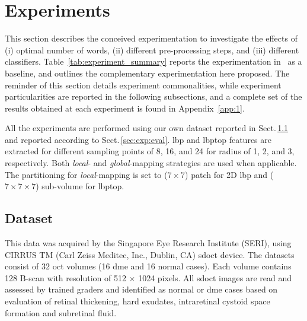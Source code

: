  \graphicspath{ {./content/experiment/figures/} }

\section{Experiments}
\label{sec:exp}


This section describes the conceived experimentation to investigate the effects
of (i) optimal number of words, (ii) different pre-processing steps, and (iii)
different classifiers.
Table~\ref{tab:experiment_summary} reports the experimentation
in~\cite{Lemaintre2015miccaiOCT} as a baseline, and outlines the complementary
experimentation here proposed.
The reminder of this section details experiment commonalities, while experiment particularities are reported in the following subsections, and a complete set of the results obtained at each experiment is found in Appendix~\ref{app:1}.

All the experiments are performed using our own dataset reported in Sect.\,\ref{sec:exp:dataset:seri} and reported according to Sect.\,\ref{sec:exp:eval}.
\ac{lbp} and \ac{lbptop} features are extracted for different sampling points of 8, 16, and 24 for radius of 1, 2, and 3, respectively.
Both \emph{local}- and \emph{global}-mapping strategies are used when applicable.
The partitioning for \emph{local}-mapping is set to ($7 \times 7$) patch for 2D \ac{lbp} and ($ 7 \times 7 \times 7$) sub-volume for \ac{lbptop}.



\subsection{Dataset}\label{sec:exp:dataset:seri}
This data was acquired by the Singapore Eye Research Institute (SERI), using CIRRUS TM (Carl Zeiss Meditec, Inc., Dublin, CA) \ac{sdoct} device. The datasets consist of 32 \ac{oct} volumes (16 \ac{dme} and 16 normal cases). Each volume contains 128 B-scan with resolution of 512 $\times$ 1024 pixels.
All \ac{sdoct} images are read and assessed by trained graders and identified as normal or \ac{dme} cases based on evaluation of retinal thickening, hard exudates, intraretinal cystoid space formation and subretinal fluid.

